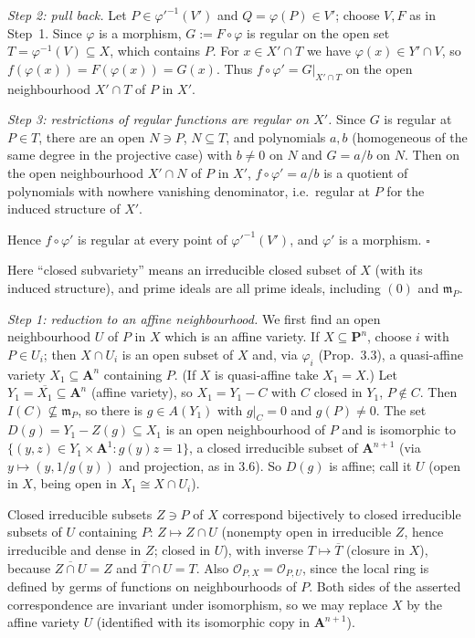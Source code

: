 \documentclass[11pt]{article}
\begin{document}
\emph{Step 2: pull back.} Let $P\in\varphi'^{-1}(V')$ and $Q=\varphi(P)\in V'$; choose $V,F$ as in Step~1. Since $\varphi$ is a morphism, $G:=F\circ\varphi$ is regular on the open set $T=\varphi^{-1}(V)\subseteq X$, which contains $P$. For $x\in X'\cap T$ we have $\varphi(x)\in Y'\cap V$, so $f(\varphi(x))=F(\varphi(x))=G(x)$. Thus $f\circ\varphi'=G|_{X'\cap T}$ on the open neighbourhood $X'\cap T$ of $P$ in $X'$.

\emph{Step 3: restrictions of regular functions are regular on $X'$.} Since $G$ is regular at $P\in T$, there are an open $N\ni P$, $N\subseteq T$, and polynomials $a,b$ (homogeneous of the same degree in the projective case) with $b\neq0$ on $N$ and $G=a/b$ on $N$. Then on the open neighbourhood $X'\cap N$ of $P$ in $X'$, $f\circ\varphi'=a/b$ is a quotient of polynomials with nowhere vanishing denominator, i.e.\ regular at $P$ for the induced structure of $X'$.

Hence $f\circ\varphi'$ is regular at every point of $\varphi'^{-1}(V')$, and $\varphi'$ is a morphism. \hfill$\square$


\pf
Here ``closed subvariety'' means an irreducible closed subset of $X$ (with its induced structure), and prime ideals are all prime ideals, including $(0)$ and $\mathfrak m_P$.

\emph{Step 1: reduction to an affine neighbourhood.} We first find an open neighbourhood $U$ of $P$ in $X$ which is an affine variety. If $X\subseteq\mathbf P^n$, choose $i$ with $P\in U_i$; then $X\cap U_i$ is an open subset of $X$ and, via $\varphi_i$ (Prop.~3.3), a quasi-affine variety $X_1\subseteq\mathbf A^n$ containing $P$. (If $X$ is quasi-affine take $X_1=X$.) Let $Y_1=\overline{X_1}\subseteq\mathbf A^n$ (affine variety), so $X_1=Y_1-C$ with $C$ closed in $Y_1$, $P\notin C$. Then $I(C)\not\subseteq\mathfrak m_P$, so there is $g\in A(Y_1)$ with $g|_C=0$ and $g(P)\ne0$. The set $D(g)=Y_1-Z(g)\subseteq X_1$ is an open neighbourhood of $P$ and is isomorphic to $\{(y,z)\in Y_1\times\mathbf A^1:g(y)z=1\}$, a closed irreducible subset of $\mathbf A^{n+1}$ (via $y\mapsto(y,1/g(y))$ and projection, as in 3.6). So $D(g)$ is affine; call it $U$ (open in $X$, being open in $X_1\cong X\cap U_i$).

Closed irreducible subsets $Z\ni P$ of $X$ correspond bijectively to closed irreducible subsets of $U$ containing $P$: $Z\mapsto Z\cap U$ (nonempty open in irreducible $Z$, hence irreducible and dense in $Z$; closed in $U$), with inverse $T\mapsto\overline T$ (closure in $X$), because $\overline{Z\cap U}=Z$ and $\overline T\cap U=T$. Also $\mathcal O_{P,X}=\mathcal O_{P,U}$, since the local ring is defined by germs of functions on neighbourhoods of $P$. Both sides of the asserted correspondence are invariant under isomorphism, so we may replace $X$ by the affine variety $U$ (identified with its isomorphic copy in $\mathbf A^{n+1}$).
\end{document}
